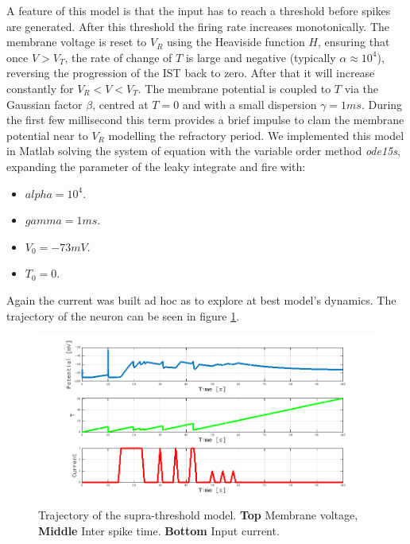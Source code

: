 		A feature of this model is that the input has to reach a threshold before spikes are generated.
		After this threshold the firing rate increases monotonically.
		The membrane voltage is reset to $V_R$ using the Heaviside function $H$, ensuring that once $V>V_T$, the rate of change of $T$ is large and negative (typically $\alpha\approx 10^4$), reversing the progression of the IST back to zero.
		After that it will increase constantly for $V_R<V<V_T$.
		The membrane potential is coupled to $T$ via the Gaussian factor $\beta$, centred at $T=0$ and with a small dispersion $\gamma=1ms$.
		During the first few millisecond this term provides a brief impulse to clam the membrane potential near to $V_R$ modelling the refractory period.
		We implemented this model in Matlab solving the system of equation with the variable order method \emph{ode15s}, expanding the parameter of the leaky integrate and fire with:

		\begin{multicols}{2}
			\begin{itemize}
				\item $alpha = 10^4$.
				\item $gamma = 1ms$.
				\item $V_0 = -73mV$.
				\item $T_0 = 0$.
			\end{itemize}
		\end{multicols}

		Again the current was built ad hoc as to explore  at best model's dynamics.
		The trajectory of the neuron can be seen in figure \ref{fig:supra-threshold}.

		\begin{figure}
			\includegraphics[width=\textwidth]{Figures/supra-threshold}
			\caption{Trajectory of the supra-threshold model. \textbf{Top} Membrane voltage, \textbf{Middle} Inter spike time. \textbf{Bottom} Input current.}
			\label{fig:supra-threshold}
		\end{figure}

